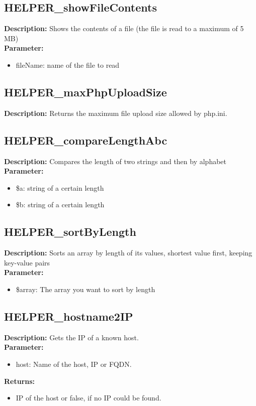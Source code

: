 \subsection{HELPER\_showFileContents}
\textbf{Description:} Shows the contents of a file (the file is read to a maximum of 5 MB)\\
\textbf{Parameter:}
\begin{itemize}
\item fileName: name of the file to read
\end{itemize}

\subsection{HELPER\_maxPhpUploadSize}
\textbf{Description:} Returns the maximum file upload size allowed by php.ini.\\

\subsection{HELPER\_compareLengthAbc}
\textbf{Description:} Compares the length of two strings and then by alphabet\\
\textbf{Parameter:}
\begin{itemize}
\item \$a: string of a certain length
\item \$b: string of a certain length
\end{itemize}

\subsection{HELPER\_sortByLength}
\textbf{Description:} Sorts an array by length of its values, shortest value first, keeping key-value pairs\\
\textbf{Parameter:}
\begin{itemize}
\item \$array: The array you want to sort by length
\end{itemize}

\subsection{HELPER\_hostname2IP}
\textbf{Description:} Gets the IP of a known host.\\
\textbf{Parameter:}
\begin{itemize}
\item host: Name of the host, IP or FQDN.
\end{itemize}
\textbf{Returns:}
\begin{itemize}
\item IP of the host or false, if no IP could be found.
\end{itemize}

